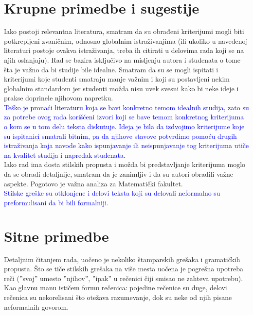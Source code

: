 \documentclass[a4paper]{report}
\newcommand{\odgovor}[1]{\textcolor{blue}{#1}}
\begin{document}
 
 \section{Krupne primedbe i sugestije}
 Iako postoji relevantna literatura, smatram da su obrađeni kriterijumi mogli biti potkrepljeni zvaničnim, odnosno globalnim istraživanjima (ili ukoliko u navedenoj literaturi postoje ovakva istraživanja, treba ih citirati u delovima rada koji se na njih oslanjaju). Rad se bazira isključivo na misljenju autora i studenata o tome šta je važno da bi studije bile idealne. Smatram da su se mogli ispitati i kriterijumi koje studenti smatraju manje važnim i koji su postavljeni nekim globalnim standardom jer studenti možda nisu uvek svesni kako bi neke ideje i prakse doprinele njihovom napretku.\\
 \odgovor{Teško je pronaći literaturu koja se bavi konkretno temom idealnih studija, zato su za potrebe ovog rada korišćeni izvori koji se bave temom konkretnog kriterijuma o kom se u tom delu teksta diskutuje. Ideja je bila da izdvojimo kriterijume koje su ispitanici smatrali bitnim, pa da njihove stavove potvrdimo pomoću drugih istraživanja koja navode kako ispunjavanje ili neispunjavanje tog kriterijuma utiče na kvalitet studija i napredak studenata.}\\
 Iako rad ima dosta stilskih propusta i možda bi predstavljanje kriterijuma moglo da se obradi detaljnije, smatram da je zanimljiv i da su autori obradili važne aspekte. Pogotovo je važna analiza za Matematički fakultet.\\
 \odgovor{Stilske greške su otklonjene i delovi teksta koji su delovali neformalno su preformulisani da bi bili formalniji.}
 
 
 \section{Sitne primedbe}
 Detaljnim čitanjem rada, uočeno je nekoliko štamparskih grešaka i gramatičkih propusta. Što se tiče stilskih grešaka na više mesta uočena je pogrešna upotreba reči (''svoj'' umesto ''njihov'', ''ipak'' u rečenici čiji smisao ne zahteva upotrebu). Kao glavnu manu ističem formu rečenica: pojedine rečenice su duge, delovi rečenica su nekorelisani što otežava razumevanje, dok su neke od njih pisane neformalnih govorom.
 
\end{document}
